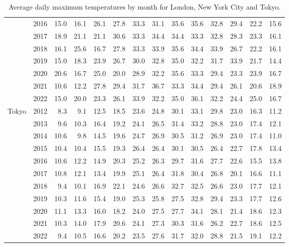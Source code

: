 \begin{table}[htbp]
\begin{adjustwidth}{-1in}{-1in}
\begin{tabular}{llrrrrrrrrrrrr}
      & 2016 &  15.0 &  16.1 &  26.1 &  27.8 &  33.3 &  31.1 &  35.6 &  35.6 &  32.8 &  29.4 &  22.2 &  15.6 \\
      & 2017 &  18.9 &  21.1 &  21.1 &  30.6 &  33.3 &  34.4 &  34.4 &  33.3 &  32.8 &  28.3 &  23.3 &  16.1 \\
      & 2018 &  16.1 &  25.6 &  16.7 &  27.8 &  33.3 &  33.9 &  35.6 &  34.4 &  33.9 &  26.7 &  22.2 &  16.1 \\
      & 2019 &  15.0 &  18.3 &  23.9 &  26.7 &  30.0 &  32.8 &  35.0 &  32.2 &  31.7 &  33.9 &  21.7 &  14.4 \\
      & 2020 &  20.6 &  16.7 &  25.0 &  20.0 &  28.9 &  32.2 &  35.6 &  33.3 &  29.4 &  23.3 &  23.9 &  16.7 \\
      & 2021 &  10.6 &  12.2 &  27.8 &  29.4 &  31.7 &  36.7 &  33.3 &  34.4 &  29.4 &  26.1 &  20.6 &  18.9 \\
      & 2022 &  15.0 &  20.0 &  23.3 &  26.1 &  33.9 &  32.2 &  35.0 &  36.1 &  32.2 &  24.4 &  25.0 &  16.7 \\
      \midrule
Tokyo & 2012 &   8.3 &   9.1 &  12.5 &  18.5 &  23.6 &  24.8 &  30.1 &  33.1 &  29.8 &  23.0 &  16.3 &  11.2 \\
      & 2013 &   9.6 &  10.3 &  16.4 &  19.2 &  24.1 &  26.5 &  31.4 &  33.2 &  28.8 &  23.0 &  17.4 &  12.1 \\
      & 2014 &  10.6 &   9.8 &  14.5 &  19.6 &  24.7 &  26.9 &  30.5 &  31.2 &  26.9 &  23.0 &  17.4 &  11.0 \\
      & 2015 &  10.4 &  10.4 &  15.5 &  19.3 &  26.4 &  26.4 &  30.1 &  30.5 &  26.4 &  22.7 &  17.8 &  13.4 \\
      & 2016 &  10.6 &  12.2 &  14.9 &  20.3 &  25.2 &  26.3 &  29.7 &  31.6 &  27.7 &  22.6 &  15.5 &  13.8 \\
      & 2017 &  10.8 &  12.1 &  13.4 &  19.9 &  25.1 &  26.4 &  31.8 &  30.4 &  26.8 &  20.1 &  16.6 &  11.1 \\
      & 2018 &   9.4 &  10.1 &  16.9 &  22.1 &  24.6 &  26.6 &  32.7 &  32.5 &  26.6 &  23.0 &  17.7 &  12.1 \\
      & 2019 &  10.3 &  11.6 &  15.4 &  19.0 &  25.3 &  25.8 &  27.5 &  32.8 &  29.4 &  23.3 &  17.7 &  12.6 \\
      & 2020 &  11.1 &  13.3 &  16.0 &  18.2 &  24.0 &  27.5 &  27.7 &  34.1 &  28.1 &  21.4 &  18.6 &  12.3 \\
      & 2021 &  10.3 &  14.0 &  17.9 &  20.6 &  24.1 &  27.3 &  30.3 &  31.6 &  26.2 &  22.7 &  18.6 &  12.5 \\
      & 2022 &   9.4 &  10.5 &  16.6 &  20.2 &  23.5 &  27.6 &  31.7 &  32.0 &  28.8 &  21.5 &  19.1 &  12.2 \\
\bottomrule
\end{tabular}
\caption[Daily maximum temperature]{Average daily maximum temperatures by month for London, New York City and Tokyo.}
\label{table:max_temp}
\end{adjustwidth}
\end{table}

